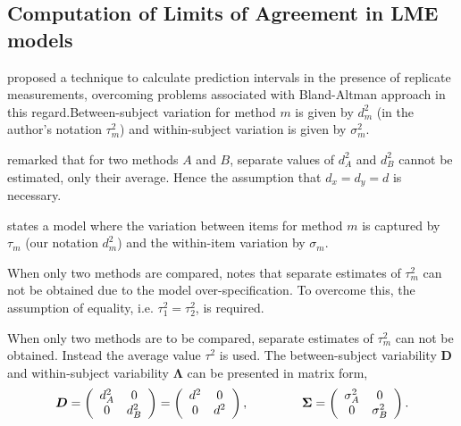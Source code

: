 \documentclass[12pt, a4paper]{report}
\theoremstyle{plain}
\theoremstyle{definition}
\theoremstyle{remark}
\begin{document}


\subsection{Computation of Limits of Agreement in LME models}


\citet{BXC2008} proposed a technique to calculate prediction intervals in the presence of replicate measurements, overcoming problems associated with Bland-Altman approach in this regard.Between-subject variation for method $m$ is given by $d^2_{m}$ (in the author's notation $\tau^2_m$) and within-subject variation is given by $\sigma^2_{m}$.  

\citet{BXC2008} remarked that for two methods $A$ and $B$, separate values of $d^2_{A}$ and $d^2_{B}$ cannot be estimated, only their average. Hence the assumption that $d_{x}= d_{y}= d$ is necessary. %

\citet{BXC2008} states a model where the variation between items for method $m$ is captured by $\tau_m$ (our notation $d^2_m$) and the within-item variation by $\sigma_m$.


When only two methods are compared, \citet{BXC2008} notes that separate estimates of $\tau^2_m$ can not be obtained due to the model over-specification. To overcome this, the assumption of equality, i.e. $\tau^2_1 = \tau^2_2$, is required.

When only two methods are to be compared, separate estimates of $\tau^2_m$ can not be obtained. Instead the average value $\tau^2$ is used. The between-subject variability $\boldsymbol{D}$ and within-subject variability $\boldsymbol{\Lambda}$ can be presented in matrix form,\[
\boldsymbol{D} = \left(%
\begin{array}{cc}
d^2_{A}& 0 \\
0 & d^2_{B} \\
\end{array}%
\right)=\left(%
\begin{array}{cc}
d^2& 0 \\
0 & d^2\\
\end{array}%
\right),
\hspace{1.5cm}
\boldsymbol{\Sigma} = \left(%
\begin{array}{cc}
\sigma^2_{A}& 0 \\
0 & \sigma^2_{B} \\
\end{array}%
\right).
\]
\end{document}
